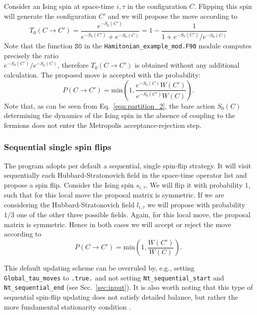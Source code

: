Consider an Ising spin at space-time $i,\tau$ in the configuration $C$. Flipping this spin will generate the configuration $C'$ and we will propose the move according to 
  \begin{equation}
 T_0(C \rightarrow C')  =  \frac{e^{-S_0(C')}}{ e^{-S_0(C')} + e^{-S_0(C)} }   = 1 - \frac{1}{1 +  e^{-S_0(C')} /e^{-S_0(C)}}
  \end{equation}
 Note that the function $\texttt{S0}$ in the  \texttt{Hamitonian\_example\_mod.F90}  module  computes precisely the ratio\\
 ${e^{-S_0(C')} /e^{-S_0(C)}}$, therefore $T_0(C \rightarrow C') $ is obtained without any additional calculation. 
 The proposed move is accepted with the probability: 
 \begin{equation}
 P(C \rightarrow C') =  \text{min}  \left( 1,  \frac{e^{-S_0(C)}   W(C')}{ e^{-S_0(C')} W(C)} \right).
 \end{equation}
 Note that, as can be seen from Eq.~\eqref{eqn:partition_2}, the bare action $S_0(C)$  determining the  dynamics of the Ising spin  in the absence of coupling to the fermions  does not enter the Metropolis acceptance-rejection step.
% 
\subsubsection{Sequential single spin flips}
%

The program adopts per default a sequential, single spin-flip strategy. It will  visit sequentially each Hubbard-Stratonovich field in the space-time operator list and  propose a spin flip. Consider  the Ising spin $s_{i,\tau}$. We will flip it with probability $1$, such that for  this local move  the  proposal matrix is symmetric.  If we are considering the Hubbard-Stratonovich field $l_{i,\tau}$  we will propose with probability $1/3$ one  of the other three  possible fields.   Again, for this local move, the proposal matrix is symmetric.  Hence in both cases we will accept or reject the move according to 
 \begin{equation}
 	P(C \rightarrow C') =  \text{min}  \left( 1, \frac{ W(C')}{W(C)} \right).
 \end{equation}

This default updating scheme can be overruled by, e.g., setting \texttt{Global\_tau\_moves} to \texttt{.true.} and not setting \texttt{Nt\_sequential\_start} and \texttt{Nt\_sequential\_end} (see Sec.~\ref{sec:input}).
It is also worth noting that this type of sequential spin-flip updating does not satisfy detailed balance, but rather the more fundamental stationarity condition \cite{Sokal89}. 
 
